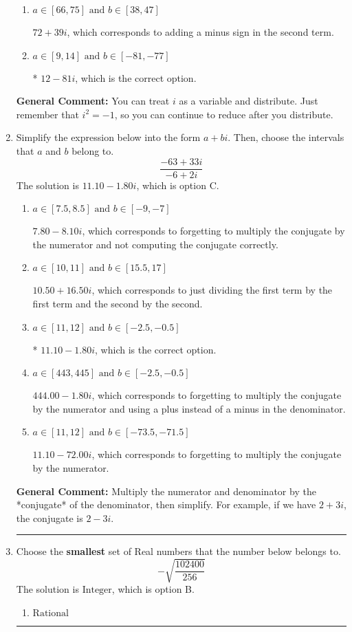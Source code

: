 \documentclass{extbook}[14pt]
\newcommand{\litem}[1]{\item #1

\rule{\textwidth}{0.4pt}}
\begin{document}
\begin{enumerate}
{\begin{enumerate}[label=\Alph*.]
 $72 - 39 i$, which corresponds to adding a minus sign in the first term.
\item \( a \in [66, 75] \text{ and } b \in [38, 47] \)

 $72 + 39 i$, which corresponds to adding a minus sign in the second term.
\item \( a \in [9, 14] \text{ and } b \in [-81, -77] \)

* $12 - 81 i$, which is the correct option.
\end{enumerate}

\textbf{General Comment:} You can treat $i$ as a variable and distribute. Just remember that $i^2=-1$, so you can continue to reduce after you distribute.
}
\litem{
Simplify the expression below into the form $a+bi$. Then, choose the intervals that $a$ and $b$ belong to.
\[ \frac{-63 + 33 i}{-6 + 2 i} \]The solution is \( 11.10  - 1.80 i \), which is option C.\begin{enumerate}[label=\Alph*.]
\item \( a \in [7.5, 8.5] \text{ and } b \in [-9, -7] \)

 $7.80  - 8.10 i$, which corresponds to forgetting to multiply the conjugate by the numerator and not computing the conjugate correctly.
\item \( a \in [10, 11] \text{ and } b \in [15.5, 17] \)

 $10.50  + 16.50 i$, which corresponds to just dividing the first term by the first term and the second by the second.
\item \( a \in [11, 12] \text{ and } b \in [-2.5, -0.5] \)

* $11.10  - 1.80 i$, which is the correct option.
\item \( a \in [443, 445] \text{ and } b \in [-2.5, -0.5] \)

 $444.00  - 1.80 i$, which corresponds to forgetting to multiply the conjugate by the numerator and using a plus instead of a minus in the denominator.
\item \( a \in [11, 12] \text{ and } b \in [-73.5, -71.5] \)

 $11.10  - 72.00 i$, which corresponds to forgetting to multiply the conjugate by the numerator.
\end{enumerate}

\textbf{General Comment:} Multiply the numerator and denominator by the *conjugate* of the denominator, then simplify. For example, if we have $2+3i$, the conjugate is $2-3i$.
}
\litem{
Choose the \textbf{smallest} set of Real numbers that the number below belongs to.
\[ -\sqrt{\frac{102400}{256}} \]The solution is \( \text{Integer} \), which is option B.\begin{enumerate}[label=\Alph*.]
\item \( \text{Rational} \)


\end{enumerate}}
\end{enumerate}
\end{document}
